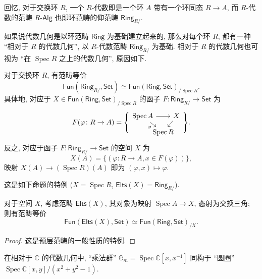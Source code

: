 \documentclass{book}
\newcommand{\elements}{\mathsf{Elts}}
\begin{document}
	回忆, 对于交换环 $R$, 一个 $R$-代数即是一个环 $A$ 带有一个环同态 $R\to A$, 而 $R$-代数的范畴 $R\text{-}\mathsf{Alg}$ 也即环范畴的仰范畴 $\mathsf{Ring}_{R/}$.
	
	如果说代数几何是以环范畴 $\mathsf{Ring}$ 为基础建立起来的, 那么对每个环 $R$, 都有一种 ``相对于 $R$ 的代数几何'', 以 $R$-代数范畴 $\mathsf{Ring}_{R/}$ 为基础. 相对于 $R$ 的代数几何也可视为 ``在 $\operatorname{Spec} R$ 之上的代数几何'', 原因如下.
	
	\begin{prop}
		[label={spaces-over-a-ring}]
		{}
		对于交换环 $R$, 有范畴等价
		$$
		\mathsf{Fun}(\mathsf{Ring}_{R/},\mathsf{Set})\simeq \mathsf{Fun}(\mathsf{Ring},\mathsf{Set})_{/\operatorname{Spec} R}.
		$$
		具体地, 对应于 $X\in\mathsf{Fun}(\mathsf{Ring},\mathsf{Set})_{/\operatorname{Spec} R}$ 的函子 $F\colon \mathsf{Ring}_{R/}\to \mathsf{Set}$ 为
		$$
		F(\varphi\colon R\to A) = \Bigg\{ \begin{tikzcd}[column sep=-9pt,row sep=7pt]
			\operatorname{Spec} A\ar[rr]\ar["\varphi"',dr] && X\ar[dl]\\
			&\operatorname{Spec} R&
		\end{tikzcd}\Bigg\}.
		$$
		反之, 对应于函子 $F\colon \mathsf{Ring}_{R/}\to\mathsf{Set}$ 的空间 $X$ 为
		$$X(A)=\{(\varphi\colon R\to A, x\in F(\varphi))\},$$
		映射 $X(A)\to(\operatorname{Spec} R)(A)$ 即为 $(\varphi,x)\mapsto \varphi$.
	\end{prop}
	
	这是如下命题的特例 ($X=\operatorname{Spec} R$, $\elements(X)=\mathsf{Ring}_{R/}$).
	
	\begin{prop}
		{}
		对于空间 $X$, 考虑范畴 $\elements(X)$, 其对象为映射 $\operatorname{Spec} A\to X$, 态射为交换三角; 则有范畴等价
		$$
		\mathsf{Fun}(\elements(X),\mathsf{Set}) \simeq \mathsf{Fun}(\mathsf{Ring},\mathsf{Set})_{/X}.
		$$
	\end{prop}
	
	\begin{proof}
		这是预层范畴的一般性质的特例.
	\end{proof}
	
	\begin{example}
		{}
		在相对于 $\mathbb{C}$ 的代数几何中, ``乘法群'' $\mathbb G_m = \operatorname{Spec} \mathbb C[x,x^{-1}]$ 同构于 ``圆圈'' $\operatorname{Spec} \mathbb C[x,y]/(x^2+y^2-1)$.
	\end{example}
	
\end{document}
